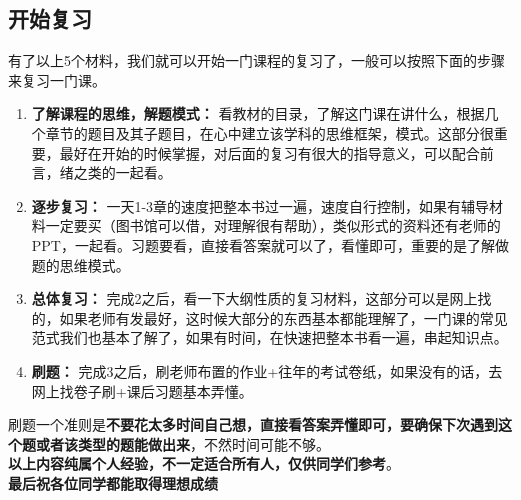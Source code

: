 \documentclass[a4paper]{article}
\begin{document}
\subsection{开始复习} \label{sub:start}
有了以上5个材料，我们就可以开始一门课程的复习了，一般可以按照下面的步骤来复习一门课。
\begin{enumerate}
	\item{\textbf{了解课程的思维，解题模式：} 看教材的目录，了解这门课在讲什么，根据几个章节的题目及其子题目，在心中建立该学科的思维框架，模式。这部分很重要，最好在开始的时候掌握，对后面的复习有很大的指导意义，可以配合前言，绪之类的一起看。}
    \item{\textbf{逐步复习：} 一天1-3章的速度把整本书过一遍，速度自行控制，如果有辅导材料一定要买（图书馆可以借，对理解很有帮助），类似形式的资料还有老师的PPT，一起看。习题要看，直接看答案就可以了，看懂即可，重要的是了解做题的思维模式。}
    \item{\textbf{总体复习：} 完成2之后，看一下大纲性质的复习材料，这部分可以是网上找的，如果老师有发最好，这时候大部分的东西基本都能理解了，一门课的常见范式我们也基本了解了，如果有时间，在快速把整本书看一遍，串起知识点。}
    \item{\textbf{刷题：} 完成3之后，刷老师布置的作业+往年的考试卷纸，如果没有的话，去网上找卷子刷+课后习题基本弄懂。}
\end{enumerate}

刷题一个准则是\textbf{不要花太多时间自己想，直接看答案弄懂即可，要确保下次遇到这个题或者该类型的题能做出来}，不然时间可能不够。\\

\textbf{以上内容纯属个人经验，不一定适合所有人，仅供同学们参考}。\\

\textbf{最后祝各位同学都能取得理想成绩 \faSmileO}

\newpage




\end{document}

